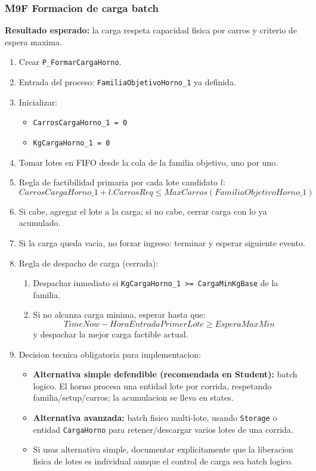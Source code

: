 \documentclass[11pt]{article}
\newcommand{\simio}[1]{\texttt{#1}}
\newcommand{\state}[1]{\texttt{#1}}
\newcommand{\proc}[1]{\texttt{#1}}
\begin{document}
\subsubsection{M9F Formacion de carga batch}
\textbf{Resultado esperado:} la carga respeta capacidad fisica por carros y criterio de espera maxima.

\begin{enumerate}
  \item Crear \proc{P\_FormarCargaHorno}.
  \item Entrada del proceso: \state{FamiliaObjetivoHorno\_1} ya definida.
  \item Inicializar:
  \begin{itemize}
    \item \state{CarrosCargaHorno\_1 = 0}
    \item \state{KgCargaHorno\_1 = 0}
  \end{itemize}
  \item Tomar lotes en FIFO desde la cola de la familia objetivo, uno por uno.
  \item Regla de factibilidad primaria por cada lote candidato \(l\):
  \[
  CarrosCargaHorno\_1 + l.CarrosReq \le MaxCarros(FamiliaObjetivoHorno\_1)
  \]
  \item Si cabe, agregar el lote a la carga; si no cabe, cerrar carga con lo ya acumulado.
  \item Si la carga queda vacia, no forzar ingreso: terminar y esperar siguiente evento.
  \item Regla de despacho de carga (cerrada):
  \begin{enumerate}
    \item Despachar inmediato si \state{KgCargaHorno\_1 >= CargaMinKgBase} de la familia.
    \item Si no alcanza carga minima, esperar hasta que:
    \[
    TimeNow - HoraEntradaPrimerLote \ge EsperaMaxMin
    \]
    y despachar la mejor carga factible actual.
  \end{enumerate}
  \item Decision tecnica obligatoria para implementacion:
  \begin{itemize}
    \item \textbf{Alternativa simple defendible (recomendada en Student):} batch logico. El horno procesa una entidad lote por corrida, respetando familia/setup/carros; la acumulacion se lleva en states.
    \item \textbf{Alternativa avanzada:} batch fisico multi-lote, usando \simio{Storage} o entidad \simio{CargaHorno} para retener/descargar varios lotes de una corrida.
    \item Si usas alternativa simple, documentar explicitamente que la liberacion fisica de lotes es individual aunque el control de carga sea batch logico.
  \end{itemize}
\end{enumerate}
\end{document}
